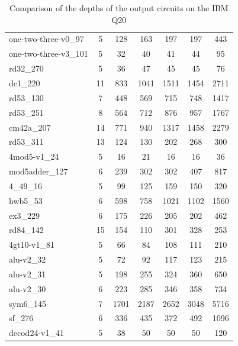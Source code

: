 \documentclass[runningheads]{llncs}
\begin{document}
\begin{table}[!ht]
\begin{center}
\begin{tabular}{|p{4.3cm}<{\centering}|c|c|c|c|c|c|}
							one-two-three-v0\_97 & 5 & 128 & 163 & 197 & 197 & 443 \\
							one-two-three-v3\_101 & 5 & 32 & 40 & 41 & 44 & 95 \\
							rd32\_270 & 5 & 36 & 47 & 45 & 45 & 76 \\
							dc1\_220 & 11 & 833 & 1041 & 1511 & 1454 & 2711 \\
							rd53\_130 & 7 & 448 & 569 & 715 & 748 & 1417 \\
							rd53\_251 & 8 & 564 & 712 & 876 & 957 & 1767 \\
							cm42a\_207 & 14 & 771 & 940 & 1317 & 1458 & 2279 \\
							rd53\_311 & 13 & 124 & 130 & 202 & 268 & 300 \\
							4mod5-v1\_24 & 5 & 16 & 21 & 16 & 16 & 36 \\
							mod5adder\_127 & 6 & 239 & 302 & 302 & 407 & 817 \\
							4\_49\_16 & 5 & 99 & 125 & 159 & 150 & 320 \\
							hwb5\_53 & 6 & 598 & 758 & 1021 & 1102 & 1560 \\
							ex3\_229 & 6 & 175 & 226 & 205 & 202 & 462 \\
							rd84\_142 & 15 & 154 & 110 & 301 & 328 & 253 \\
							4gt10-v1\_81 & 5 & 66 & 84 & 108 & 111 & 210 \\
							alu-v2\_32 & 5 & 72 & 92 & 117 & 123 & 215 \\
							alu-v2\_31 & 5 & 198 & 255 & 324 & 360 & 650 \\
							alu-v2\_30 & 6 & 223 & 285 & 346 & 358 & 734 \\
							sym6\_145 & 7 & 1701 & 2187 & 2652 & 3048 & 5716 \\
							sf\_276 & 6 & 336 & 435 & 372 & 492 & 1096 \\
							decod24-v1\_41 & 5 & 38 & 50 & 50 & 50 & 120 \\
						\hline
							\end{tabular} 
							\end{center} 
							\caption{Comparison of  the depths of the output circuits on the IBM Q20} 
							\label{tab8}	
\end{table}
\end{document}
